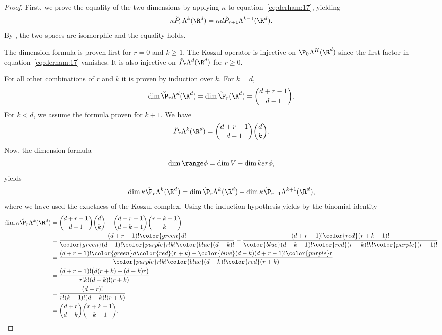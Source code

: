 \begin{proof}
  First, we prove the equality of the two dimensions by applying $\kappa$
  to equation~\eqref{eq:derham:17}, yielding
  \begin{gather}
    \kappa \breve P_r\Lambda^k(\R^d)
    = \kappa d \breve P_{r+1}\Lambda^{k-1}(\R^d).
  \end{gather}
  By , the two spaces are
  isomorphic and the equality holds.

  The dimension formula is proven first for $r=0$ and $k\ge 1$. The
  Koszul operator is injective on $\P_0\Lambda^K(\R^d)$ since the
  first factor in equation~\eqref{eq:derham:17} vanishes. It is
  also injective on $\breve P_r\Lambda^d(\R^d)$ for $r\ge 0$.

  For all other combinations of $r$ and $k$ it is proven by induction
  over $k$. For $k=d$,
  \begin{gather}
    \dim \breve\P_r\Lambda^d(\R^d) = \dim\breve\P_r(\R^d)
    = \binom{d+r-1}{d-1}.
  \end{gather}
  For $k<d$, we assume the formula proven for $k+1$. We have
  \begin{gather}
    \breve P_r\Lambda^k(\R^d) = \binom{d+r-1}{d-1}\binom{d}{k}.
  \end{gather}
  Now, the dimension formula
  \begin{gather}
    \dim \range \phi = \dim V - \dim ker \phi,
  \end{gather}
  yields
  \begin{gather}
    \dim\kappa\breve \P_r\Lambda^k(\R^d) =
    \dim\breve \P_r\Lambda^k(\R^d)
    - \dim\kappa\breve \P_{r-1}\Lambda^{k+1}(\R^d),
  \end{gather}
  where we have used the exactness of the Koszul complex.
  Using the induction hypothesis yields by the binomial identity
  \begin{align}
    \dim\kappa\breve \P_r\Lambda^k(\R^d) 
    &= \binom{d+r-1}{d-1}\binom{d}{k} - \binom{d+r-1}{d-k-1}\binom{r+k-1}{k}
    \\
    &= \frac{(d+r-1)!{\color{green}d!}}{{\color{green}(d-1)!}{\color{purple}r!}k!{\color{blue}(d-k)!}}
      - \frac{(d+r-1)!{\color{red}(r+k-1)!}}{{\color{blue}(d-k-1)!}
      {\color{red}(r+k)!}k!{\color{purple}(r-1)!}}
    \\
    &=
      \frac{(d+r-1)!{\color{green}d}{\color{red}(r+k)}-{\color{blue}(d-k)}(d+r-1)!{\color{purple}r}}
      {{\color{purple}r!}k!{\color{blue}(d-k)!}{\color{red}(r+k)}}
    \\
    &= \frac{(d+r-1)!\bigl(d(r+k)-(d-k)r\bigr)}{r!k!(d-k)!(r+k)}
    \\
    &= \frac{(d+r)!}{r!(k-1)!(d-k)!(r+k)}
    \\
    &= \binom{d+r}{d-k}\binom{r+k-1}{k-1}.
  \end{align}
\end{proof}

